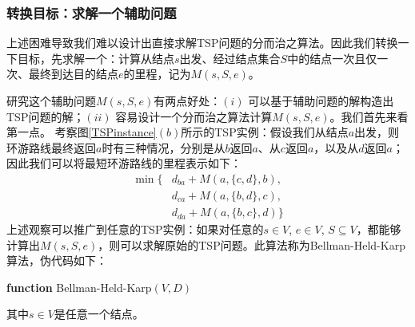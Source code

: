 \subsubsection*{转换目标：求解一个辅助问题}
	上述困难导致我们难以设计出直接求解TSP问题的分而治之算法。因此我们转换一下目标，先求解一个：计算从结点$s$出发、经过结点集合$S$中的结点一次且仅一次、最终到达目的结点$e$的里程，记为$M(s, S, e)$。
	
	研究这个辅助问题$M(s, S, e)$有两点好处：$(i)$ 可以基于辅助问题的解构造出TSP问题的解；$(ii)$ 容易设计一个分而治之算法计算$M(s, S, e)$。我们首先来看第一点。
	 	考察图\ref{TSPinstance}$(b)$所示的TSP实例：假设我们从结点$a$出发，则环游路线最终返回$a$时有三种情况，分别是从$b$返回$a$、从$c$返回$a$，以及从$d$返回$a$；因此我们可以将最短环游路线的里程表示如下：
\[ 
\begin{array}{lll}
\min\{&d_{ba} + M(a, \{c, d\}, b), \\ 
              & d_{ca} + M(a, \{b, d\}, c ), \\ 
              & d_{da} + M(a, \{b, c\}, d ) \}
\end{array}            
\]
上述观察可以推广到任意的TSP实例：如果对任意的$s\in V$, $e\in V$, $S\subseteq V$，都能够计算出$M(s, S, e)$，则可以求解原始的TSP问题。此算法称为{\sc Bellman-Held-Karp}算法\cite{HeldKarp1961,Bellman1962}，伪代码如下：
\begin{algorithm}[H]
\caption{{\sc Bellman-Held-Karp} algorithm for TSP}\label{TSPHeldKarpAlgo}
{\bf function} {\sc Bellman-Held-Karp}{$(V, D)$} 
\begin{algorithmic}[1]
	\ELSE
	\ENDIF
\end{algorithmic}
\end{algorithm}

其中$s\in V$是任意一个结点。
	
